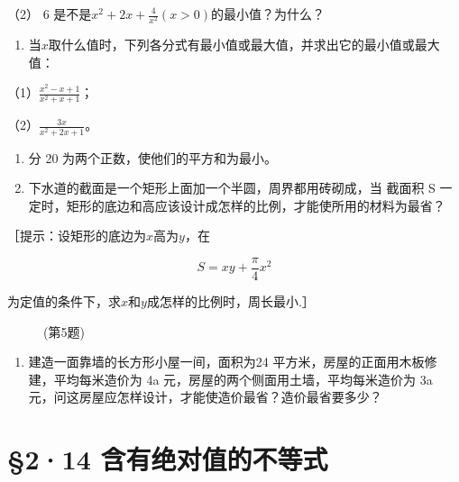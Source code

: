 （2） 6 是不是\(x^{2} + 2x + \frac{4}{x^{2}} (x > 0)\)的最小值？为什么？

\begin{enumerate}[start=3]
\item
  当\(x\)取什么值时，下列各分式有最小值或最大值，并求出它的最小值或最大值：
\end{enumerate}

（1）\(\frac{x^2 - x + 1}{x^2 + x + 1}\)；

（2）\(\frac{3x}{x^2 + 2x + 1}\)。

\begin{enumerate}[start=4]
\item
  分 20 为两个正数，使他们的平方和为最小。
\item
  下水道的截面是一个矩形上面加一个半圆，周界都用砖砌成，当 截面积 S
  一定时，矩形的底边和高应该设计成怎样的比例，才能使所用的材料为最省？
\end{enumerate}

［提示：设矩形的底边为\(x\)高为\(y\)，在

\[
S = x y + \frac{\pi}{4}x^2
\]

为定值的条件下，求\(x\)和\(y\)成怎样的比例时，周长最小.］

\begin{figure}
\centering
\caption{(第5题)}
\end{figure}


\begin{enumerate}[start=6]
\item
  建造一面靠墙的长方形小屋一间，面积为24
  平方米，房屋的正面用木板修建，平均每米造价为 4a
  元，房屋的两个侧面用土墙，平均每米造价为 3a
  元，问这房屋应怎样设计，才能使造价最省？造价最省要多少？
\end{enumerate}

\section{§2·14 含有绝对值的不等式}

